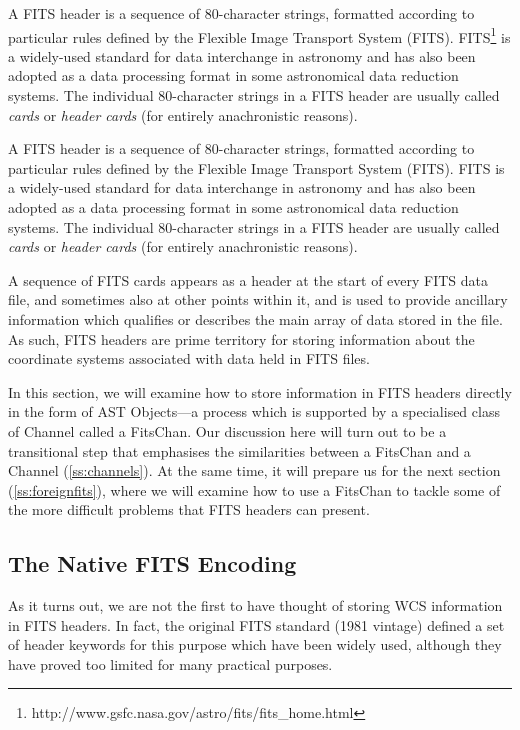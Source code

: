 \documentclass[twoside,11pt]{article}
\newcommand{\htmladdnormallink}[2]{#1}
\newenvironment{latexonly}{}{}
\newcommand{\secref}[1]{\S\ref{#1}}
\renewcommand{\secref}[1]{\ref{#1}}
\begin{document}
\begin{latexonly}
A FITS header is a sequence of 80-character strings, formatted
according to particular rules defined by the Flexible Image Transport
System
(FITS). FITS\footnote{http://www.gsfc.nasa.gov/astro/fits/fits\_home.html}
is a widely-used standard for data interchange in astronomy and has
also been adopted as a data processing format in some astronomical
data reduction systems.  The individual 80-character strings in a FITS
header are usually called {\em{cards}} or {\em{header cards}} (for
entirely anachronistic reasons).
\end{latexonly}
\begin{htmlonly}
A FITS header is a sequence of 80-character strings, formatted
according to particular rules defined by the Flexible Image Transport
System (FITS).
\htmladdnormallink{FITS}{http://www.gsfc.nasa.gov/astro/fits/fits_home.html}
is a widely-used standard for data interchange in astronomy and has
also been adopted as a data processing format in some astronomical
data reduction systems.  The individual 80-character strings in a FITS
header are usually called {\em{cards}} or {\em{header cards}} (for
entirely anachronistic reasons).
\end{htmlonly}

A sequence of FITS cards appears as a header at the start of every
FITS data file, and sometimes also at other points within it, and is
used to provide ancillary information which qualifies or describes the
main array of data stored in the file. As such, FITS headers are prime
territory for storing information about the coordinate systems
associated with data held in FITS files.

In this section, we will examine how to store information in FITS
headers directly in the form of AST Objects---a process which is
supported by a specialised class of Channel called a FitsChan. Our
discussion here will turn out to be a transitional step that
emphasises the similarities between a FitsChan and a Channel
(\secref{ss:channels}). At the same time, it will prepare us for the
next section (\secref{ss:foreignfits}), where we will examine how to
use a FitsChan to tackle some of the more difficult problems that FITS
headers can present.

\subsection{\label{ss:nativeencoding}The Native FITS Encoding}

As it turns out, we are not the first to have thought of storing WCS
information in FITS headers. In fact, the original FITS standard (1981
vintage) defined a set of header keywords for this purpose which have
been widely used, although they have proved too limited for many
practical purposes.
\end{document}
